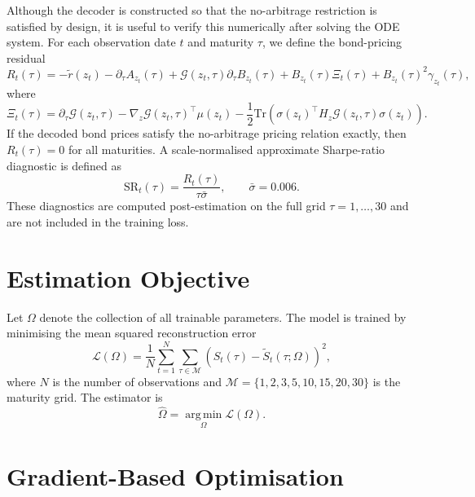 Although the decoder is constructed so that the no-arbitrage restriction is satisfied by design, it is useful to verify this numerically after solving the ODE system. For each observation date $t$ and maturity $\tau$, we define the bond-pricing residual
\begin{equation}
R_t(\tau)
=
- \tilde r(z_t)
- \partial_\tau A_{z_t}(\tau)
+ \mathcal{G}(z_t,\tau)\partial_\tau B_{z_t}(\tau)
+ B_{z_t}(\tau)\Xi_t(\tau)
+ B_{z_t}(\tau)^2 \gamma_{z_t}(\tau),
\label{eq:bond_pricing_residual}
\end{equation}
where
\begin{equation}
\Xi_t(\tau)
=
\partial_\tau \mathcal{G}(z_t,\tau)
-
\nabla_z \mathcal{G}(z_t,\tau)^\top \mu(z_t)
-
\frac{1}{2}
\mathrm{Tr}\!\left(\sigma(z_t)^\top H_z \mathcal{G}(z_t,\tau)\sigma(z_t)\right).
\label{eq:Xi_term}
\end{equation}
If the decoded bond prices satisfy the no-arbitrage pricing relation exactly, then $R_t(\tau)=0$ for all maturities. A scale-normalised approximate Sharpe-ratio diagnostic is defined as
\begin{equation}
\mathrm{SR}_t(\tau) = \frac{R_t(\tau)}{\tau \bar{\sigma}}, \qquad \bar{\sigma} = 0.006.
\label{eq:approx_sharpe_ratio}
\end{equation}
These diagnostics are computed post-estimation on the full grid $\tau=1,\dots,30$ and are not included in the training loss.

\section{Estimation Objective}
\label{sec:estimation_objective}

Let $\Omega$ denote the collection of all trainable parameters. The model is trained by minimising the mean squared reconstruction error
\begin{equation}
\mathcal{L}(\Omega)
=
\frac{1}{N}
\sum_{t=1}^{N}
\sum_{\tau \in \mathcal{M}}
\left(
S_t(\tau) - \widetilde{S}_t(\tau;\Omega)
\right)^2,
\label{eq:training_loss}
\end{equation}
where $N$ is the number of observations and $\mathcal{M}=\{1,2,3,5,10,15,20,30\}$ is the maturity grid. The estimator is
\begin{equation}
\hat{\Omega}
=
\operatorname*{arg\,min}_{\Omega}\mathcal{L}(\Omega).
\label{eq:estimator}
\end{equation}

\section{Gradient-Based Optimisation}
\label{sec:gradient_based_optimization}

